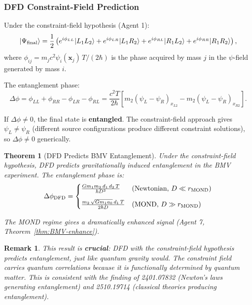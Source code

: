 \documentclass[11pt,a4paper]{article}
\newtheorem{theorem}{Theorem}
\newtheorem{remark}{Remark}
\begin{document}
\subsubsection{DFD Constraint-Field Prediction}

Under the constraint-field hypothesis (Agent 1):
\begin{equation}
|\Psi_{\rm final}\rangle = \frac{1}{2}\left(
e^{i\phi_{LL}}|L_1 L_2\rangle + e^{i\phi_{LR}}|L_1 R_2\rangle
+ e^{i\phi_{RL}}|R_1 L_2\rangle + e^{i\phi_{RR}}|R_1 R_2\rangle
\right),
\end{equation}
where $\phi_{ij} = m_j c^2 \psi_{i}(\mathbf{x}_j)\,T/(2\hbar)$ is the phase acquired by mass $j$ in the $\psi$-field generated by mass $i$.

The entanglement phase:
\begin{equation}
\Delta\phi = \phi_{LL} + \phi_{RR} - \phi_{LR} - \phi_{RL}
= \frac{c^2 T}{2\hbar}\left[m_2(\psi_L - \psi_R)_{x_{L2}} - m_2(\psi_L - \psi_R)_{x_{R2}}\right].
\end{equation}

If $\Delta\phi \neq 0$, the final state is \textbf{entangled}. The constraint-field approach gives $\psi_L \neq \psi_R$ (different source configurations produce different constraint solutions), so $\Delta\phi \neq 0$ generically.

\begin{theorem}[DFD Predicts BMV Entanglement]
\label{thm:DFD-BMV}
Under the constraint-field hypothesis, DFD predicts gravitationally induced entanglement in the BMV experiment. The entanglement phase is:
\begin{equation}
\Delta\phi_{\rm DFD} = \begin{cases}
\frac{Gm_1 m_2\,d_1\,d_2\,T}{\hbar D^3} & \text{(Newtonian, $D \ll r_{\rm MOND}$)} \\[8pt]
\frac{m_2\,\sqrt{Gm_1 a_0}\,d_1\,T}{2\hbar D} & \text{(MOND, $D \gg r_{\rm MOND}$)}
\end{cases}
\end{equation}

The MOND regime gives a dramatically enhanced signal (Agent 7, Theorem~\ref{thm:BMV-enhance}).
\end{theorem}

\begin{remark}
This result is \textbf{crucial}: DFD with the constraint-field hypothesis predicts entanglement, just like quantum gravity would. The constraint field carries quantum correlations because it is functionally determined by quantum matter. This is consistent with the finding of 2401.07832 (Newton's laws generating entanglement) and 2510.19714 (classical theories producing entanglement).
\end{remark}
\end{document}
